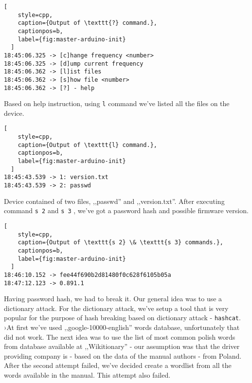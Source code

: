 \begin{minipage}{\linewidth}
  \begin{lstlisting}[
    style=cpp,
    caption={Output of \texttt{?} command.},
    captionpos=b,
    label={fig:master-arduino-init}
  ]
18:45:06.325 -> [c]hange frequency <number>
18:45:06.325 -> [d]ump current frequency
18:45:06.362 -> [l]ist files
18:45:06.362 -> [s]how file <number>
18:45:06.362 -> [?] - help
  \end{lstlisting}
  \end{minipage}

Based on help instruction, using \texttt{l} command we've listed all the files on the device.

\begin{minipage}{\linewidth}
  \begin{lstlisting}[
    style=cpp,
    caption={Output of \texttt{l} command.},
    captionpos=b,
    label={fig:master-arduino-init}
  ]
18:45:43.539 -> 1: version.txt
18:45:43.539 -> 2: passwd
  \end{lstlisting}
  \end{minipage}

Device contained of two files, ,,passwd'' and ,,version.txt''. After executing command \texttt{s 2} and \texttt{s 3} , we've got a password hash and possible firmware version.


\begin{minipage}{\linewidth}
  \begin{lstlisting}[
    style=cpp,
    caption={Output of \texttt{s 2} \& \texttt{s 3} commands.},
    captionpos=b,
    label={fig:master-arduino-init}
  ]
18:46:10.152 -> fee44f690b2d81480f0c628f6105b05a
18:47:12.123 -> 0.891.1
  \end{lstlisting}
  \end{minipage}

Having password hash, we had to break it. Our general idea was to use a dictionary attack. For the dictionary attack, we've setup a tool that is very popular for the purpose of hash breaking based on dictionary attack - \texttt{hashcat}. ›At first we've used ,,google-10000-english'' words database, unfortunately that did not work. The next idea was to use the list of most common polish words from database available at ,,Wikitionary'' - our assumption was that the driver providing company is - based on the data of the manual authors - from Poland. After the second attempt failed, we've decided create a wordlist from all the words available in the manual. This attempt also failed.

